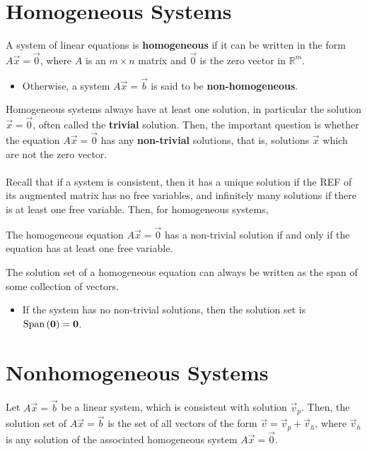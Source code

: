 \documentclass[letterpaper,12pt]{article}
\begin{document}
\section*{Homogeneous Systems}
\begin{definition}
A system of linear equations is \textbf{homogeneous} if it can be written in the form $A\vec{x} = \vec{0}$, where $A$ is an $m \times n$ matrix and $\vec{0}$ is the zero vector in $\mathbb{R}^m$.
\begin{itemize}
    \item Otherwise, a system $A\vec{x} = \vec{b}$ is said to be \textbf{non-homogeneous}.
\end{itemize}
\end{definition}

Homogeneous systems always have at least one solution, in particular the solution $\vec{x} = \vec{0}$, often called the \textbf{trivial} solution. Then, the important question is whether the equation $A\vec{x} = \vec{0}$ has any \textbf{non-trivial} solutions, that is, solutions $\vec{x}$ which are not the zero vector.
\\ \\ Recall that if a system is consistent, then it has a unique solution if the REF of its augmented matrix has no free variables, and infinitely many solutions if there is at least one free variable. Then, for homogeneous systems,

\begin{theorem}
The homogeneous equation $A\vec{x} = \vec{0}$ has a non-trivial solution if and only if the equation has at least one free variable.
\end{theorem}

The solution set of a homogeneous equation can always be written as the span of some collection of vectors.
\begin{itemize}
    \item If the system has no non-trivial solutions, then the solution set is $\text{Span}\left(\mathbf{0} \right) = \mathbf{0}$.
\end{itemize}

\section*{Nonhomogeneous Systems}
\begin{theorem}
Let $A\vec{x} = \vec{b}$ be a linear system, which is consistent with solution $\vec{v}_p$. Then, the solution set of $A\vec{x} = \vec{b}$ is the set of all vectors of the form $\vec{v} = \vec{v}_p + \vec{v}_h$, where $\vec{v}_h$ is any solution of the associated homogeneous system $A\vec{x} = \vec{0}$.
\end{theorem}
\end{document}
